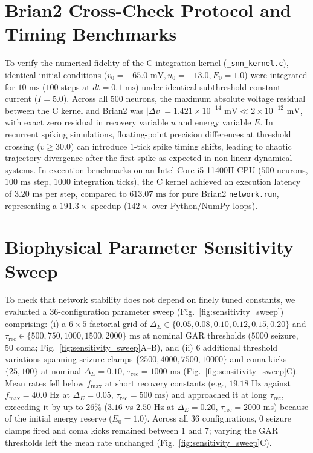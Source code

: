 \documentclass[journal]{IEEEtran}
\begin{document}
\section{Brian2 Cross-Check Protocol and Timing Benchmarks}
\label{app:brian2}
To verify the numerical fidelity of the C integration kernel (\texttt{\_snn\_kernel.c}), identical initial conditions ($v_0 = -65.0\text{ mV}, u_0 = -13.0, E_0 = 1.0$) were integrated for $10\text{ ms}$ ($100$ steps at $dt = 0.1\text{ ms}$) under identical subthreshold constant current ($I = 5.0$). Across all $500$ neurons, the maximum absolute voltage residual between the C kernel and Brian2 was $|\Delta v| = 1.421 \times 10^{-14}\text{ mV} \ll 2\times 10^{-12}\text{ mV}$, with exact zero residual in recovery variable $u$ and energy variable $E$. In recurrent spiking simulations, floating-point precision differences at threshold crossing ($v \ge 30.0$) can introduce $1$-tick spike timing shifts, leading to chaotic trajectory divergence after the first spike as expected in non-linear dynamical systems. In execution benchmarks on an Intel Core i5-11400H CPU ($500$ neurons, $100\text{ ms}$ step, $1000$ integration ticks), the C kernel achieved an execution latency of $3.20\text{ ms}$ per step, compared to $613.07\text{ ms}$ for pure Brian2 \texttt{network.run}, representing a $191.3\times$ speedup ($142\times$ over Python/NumPy loops).

\section{Biophysical Parameter Sensitivity Sweep}
\label{app:sensitivity}
To check that network stability does not depend on finely tuned constants, we evaluated a $36$-configuration parameter sweep (Fig.~\ref{fig:sensitivity_sweep}) comprising: (i) a $6 \times 5$ factorial grid of $\Delta_E \in \{0.05, 0.08, 0.10, 0.12, 0.15, 0.20\}$ and $\tau_{\mathrm{rec}} \in \{500, 750, 1000, 1500, 2000\}\text{ ms}$ at nominal GAR thresholds ($5000$ seizure, $50$ coma; Fig.~\ref{fig:sensitivity_sweep}A--B), and (ii) $6$ additional threshold variations spanning seizure clamps $\{2500, 4000, 7500, 10000\}$ and coma kicks $\{25, 100\}$ at nominal $\Delta_E = 0.10$, $\tau_{\mathrm{rec}} = 1000\text{ ms}$ (Fig.~\ref{fig:sensitivity_sweep}C). Mean rates fell below $f_{\max}$ at short recovery constants (e.g., $19.18\text{ Hz}$ against $f_{\max} = 40.0\text{ Hz}$ at $\Delta_E = 0.05$, $\tau_{\mathrm{rec}} = 500\text{ ms}$) and approached it at long $\tau_{\mathrm{rec}}$, exceeding it by up to $26\%$ ($3.16$ vs $2.50\text{ Hz}$ at $\Delta_E = 0.20$, $\tau_{\mathrm{rec}} = 2000\text{ ms}$) because of the initial energy reserve ($E_0 = 1.0$). Across all $36$ configurations, $0$ seizure clamps fired and coma kicks remained between $1$ and $7$; varying the GAR thresholds left the mean rate unchanged (Fig.~\ref{fig:sensitivity_sweep}C).
\end{document}
